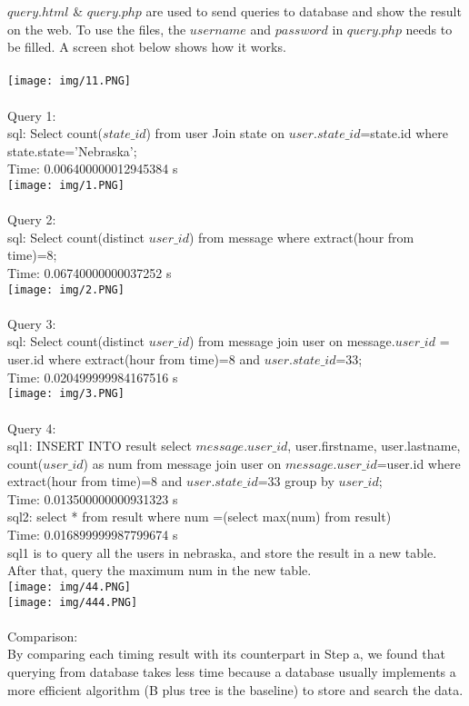 \documentclass[a4paper]{article}
\begin{document}
$query.html$ \& $query.php$ are used to send queries to database and show the result on the web. To use the files, the $username$ and $password$ in $query.php$ needs to be filled. A screen shot below shows how it works. \\\\
\texttt{[image: img/11.PNG]}\\\\
Query 1:\\
sql: Select count($state\_id$) from user Join state on $user.state\_id$=state.id where state.state='Nebraska';\\
Time: 0.006400000012945384 s\\
\texttt{[image: img/1.PNG]}\\\\
Query 2:\\
sql: Select count(distinct $user\_id$) from message where extract(hour from time)=8;\\
Time: 0.06740000000037252  s\\
\texttt{[image: img/2.PNG]}\\\\
Query 3:\\
sql: Select count(distinct $user\_id$) from message join user on message.$user\_id$ = user.id where extract(hour from time)=8 and $user.state\_id$=33;\\
Time: 0.020499999984167516 s\\  
\texttt{[image: img/3.PNG]}\\\\
Query 4:\\
sql1: INSERT INTO result select  $message.user\_id$, user.firstname, user.lastname, count($user\_id$) as num from message join user on $message.user\_id$=user.id where extract(hour from time)=8 and $user.state\_id$=33 group by $user\_id$;\\
Time: 0.013500000000931323 s\\
sql2: select * from result where num =(select max(num) from result) \\
Time: 0.016899999987799674 s\\
sql1 is to query all the users in nebraska, and store the result in a new table. After that, query the maximum num in the new table.\\
\texttt{[image: img/44.PNG]}\\
\texttt{[image: img/444.PNG]}\\
\\
Comparison:\\
By comparing each timing result with its counterpart in Step a, we found that querying from database takes less time because a database usually implements a more efficient algorithm (B plus tree is the baseline) to store and search the data.\\
\newpage
\end{document}
